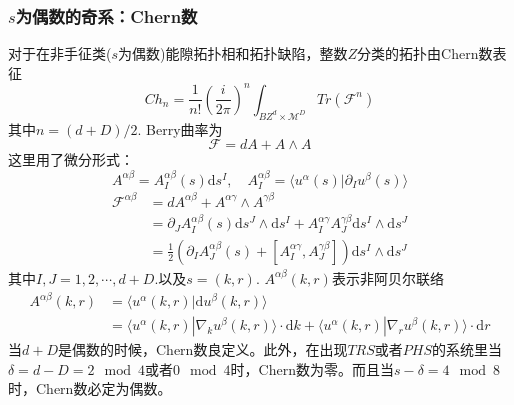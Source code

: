 \documentclass{article}
\numberwithin{equation}{subsection}
\begin{document}
\subsubsection{$s$为偶数的奇系：Chern数}
对于在非手征类($s$为偶数)能隙拓扑相和拓扑缺陷，整数$Z$分类的拓扑由Chern数表征
\begin{equation}
    Ch_n=\frac{1}{n!}\left(\frac{i}{2\pi}\right)^n\int_{BZ^d\times\mathcal{M}^D}Tr(\mathcal{F}^n)
\end{equation}
其中$n=(d+D)/2$. Berry曲率为
\begin{equation}
    \mathcal{F}=dA+A\wedge A
\end{equation}
这里用了微分形式：
\begin{equation}
    A^{\alpha\beta}=A_I^{\alpha\beta}(s)\mathrm{d}s^I,\quad A_I^{\alpha\beta}=\langle u^\alpha(s)|\partial_I u^\beta(s)\rangle
\end{equation}
\begin{equation}
    \begin{split}
        \mathcal{F}^{\alpha\beta}&=dA^{\alpha\beta}+A^{\alpha\gamma}\wedge A^{\gamma\beta}\\
        &=\partial_J A_I^{\alpha\beta}(s)\mathrm{d}s^J\wedge\mathrm{d}s^I+A_I^{\alpha\gamma}A_J^{\gamma\beta}\mathrm{d}s^I\wedge\mathrm{d}s^J\\
        &=\frac{1}{2}(\partial_IA_J^{\alpha\beta}(s)+[A_I^{\alpha\gamma},A_J^{\gamma\beta}])\mathrm{d}s^I\wedge \mathrm{d}s^J
    \end{split}
\end{equation}
其中$I,J=1,2,\cdots,d+D.$以及$s=(k,r)$. $A^{\alpha\beta}(k,r)$表示非阿贝尔联络
\begin{equation}
    \begin{split}
        A^{\alpha\beta}(k,r)&=\langle u^{\alpha}(k,r)|\mathrm{d}u^\beta(k,r)\rangle\\
        &=\langle u^\alpha(k,r)|\nabla_k u^\beta(k,r)\rangle\cdot \mathrm{d}k+\langle u^\alpha(k,r)|\nabla_r u^\beta(k,r)\rangle\cdot \mathrm{d}r
    \end{split}
\end{equation}
当$d+D$是偶数的时候，Chern数良定义。此外，在出现$TRS$或者$PHS$的系统里当$\delta=d-D=2\mod{4}$或者$0\mod{4}$时，Chern数为零。而且当$s-\delta=4\mod{8}$时，Chern数必定为偶数。
\end{document}
